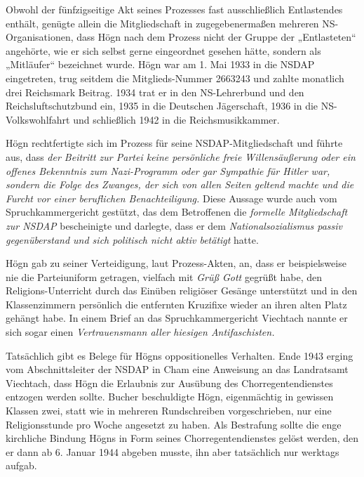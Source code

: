 \documentclass{book}
\begin{document}
Obwohl der fünfzigseitige Akt seines Prozesses fast ausschließlich
Entla\-stendes enthält, genügte allein die Mitgliedschaft in
zugegebenermaßen mehre\-ren NS-Organisationen, dass Högn nach dem
Prozess nicht der Gruppe der „Entlasteten“ angehörte, wie er sich
selbst gerne eingeordnet gesehen hätte, sondern als „Mitläufer“
bezeichnet wurde. Högn war am 1. Mai 1933 in die NSDAP eingetreten,
trug seitdem die Mitglieds-Nummer 2663243 und zahlte monatlich drei
Reichsmark Beitrag. 1934 trat er in den NS-Lehrerbund und den
Reichsluftschutzbund ein, 1935 in die Deutschen Jägerschaft, 1936 in
die NS-Volkswohlfahrt und schließlich 1942 in die Reichsmusikkammer.


Högn rechtfertigte sich im Prozess für seine NSDAP-Mitgliedschaft und
führte aus, dass \textit{der Beitritt zur Partei keine persönliche
freie Willensäußerung oder ein offenes Bekenntnis zum Nazi-Programm
oder gar Sympathie für Hitler war, sondern die Folge des Zwanges, der
sich von allen Seiten geltend machte und die Furcht vor einer
berufli\-chen Benachteiligung. }Diese Aussage wurde auch vom
Spruchkammergericht ge\-stützt, das dem Betroffenen die
\textit{formelle Mitgliedschaft zur NSDAP} bescheinigte und darlegte,
dass er dem\textit{ Nationalsozialismus passiv gegenüberstand und sich
politisch nicht aktiv betätigt} hatte.

Högn gab zu seiner Verteidigung, laut Prozess-Akten, an, dass er
bei\-spielsweise nie die Parteiuniform getragen, vielfach mit
\textit{Grüß Gott} gegrüßt habe, den Religions-Unterricht durch das
Einüben religiöser Gesänge unter\-stützt und in den Klassenzimmern
persönlich die entfernten Kruzifixe wieder an ihren alten Platz gehängt
habe. In einem Brief an das Spruchkammergericht Viechtach nannte er
sich sogar einen \textit{Vertrauensmann aller hiesigen Antifaschisten.}

Tatsächlich gibt es Belege für Högns oppositionelles Verhalten. Ende
1943 erging vom Abschnittsleiter der NSDAP in Cham eine Anweisung an
das Landratsamt Viechtach, dass Högn die Erlaubnis zur Ausübung des
Chorre\-gentendienstes entzogen werden sollte. Bucher beschuldigte
Högn, eigen\-mächtig in gewissen Klassen zwei, statt wie in mehreren
Rundschreiben vor\-geschrieben, nur eine Religionsstunde pro Woche
angesetzt zu haben. Als Be\-strafung sollte die enge kirchliche Bindung
Högns in Form seines Chorregen\-tendienstes gelöst werden, den er dann
ab 6. Januar 1944 abgeben musste, ihn aber tatsächlich nur werktags
aufgab.
\end{document}
